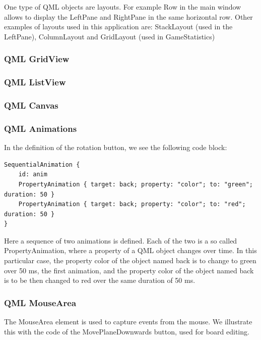 One type of QML objects are layouts. For example Row in the main window allows to display the LeftPane and RightPane in the same horizontal row. Other examples of layouts used in this application are: StackLayout (used in the LeftPane), ColumnLayout and GridLayout (used in GameStatistics)

\subsubsection {QML GridView}

\subsubsection {QML ListView}

\subsubsection {QML Canvas}

\subsubsection {QML Animations} \label{qml:animation}

In the definition of the rotation button, we see the following code block:

\begin{lstlisting}
SequentialAnimation {
	id: anim
	PropertyAnimation { target: back; property: "color"; to: "green"; duration: 50 }
	PropertyAnimation { target: back; property: "color"; to: "red"; duration: 50 }
}
\end{lstlisting}

Here a sequence of two animations is defined. Each of the two is a so called PropertyAnimation, where a property of a QML object changes over time. In this particular case, the property color of the object named back is to change to green over 50 ms, the first animation, and the property color of the object named back is to be then changed to red over the same duration of 50 ms.


\subsubsection {QML MouseArea} \label{qml:mouse_area}

The MouseArea element is used to capture events from the mouse. We illustrate this with the code of the MovePlaneDownwards button, used for board editing.

